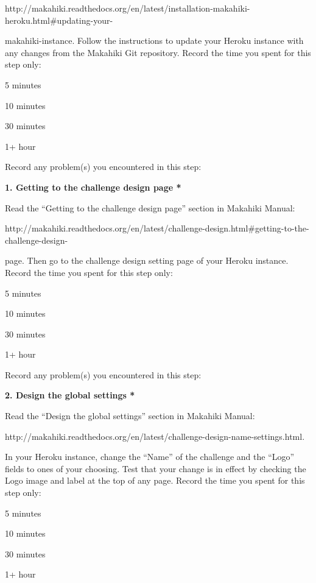 http://makahiki.readthedocs.org/en/latest/installation-makahiki-heroku.html\#updating-your-

makahiki-instance. Follow the instructions to update your Heroku instance with any changes from the Makahiki Git repository. Record the time you spent for this step only:

\begin{radiobutton}
\item 5 minutes
\item  10 minutes
\item  30 minutes
\item  1+ hour
\end{radiobutton}

Record any problem(s) you encountered in this step: \underline{\hspace{4cm}}

{\bf 1. Getting to the challenge design page *}

Read the ``Getting to the challenge design page'' section in Makahiki Manual:

http://makahiki.readthedocs.org/en/latest/challenge-design.html\#getting-to-the-challenge-design-

page. Then go to the challenge design setting page of your Heroku instance. Record the time you spent for this step only:

\begin{radiobutton}
\item 5 minutes
\item  10 minutes
\item  30 minutes
\item  1+ hour
\end{radiobutton}

Record any problem(s) you encountered in this step: \underline{\hspace{4cm}}

{\bf 2. Design the global settings *}

Read the ``Design the global settings'' section in Makahiki Manual:

http://makahiki.readthedocs.org/en/latest/challenge-design-name-settings.html. 

In your Heroku instance, change the ``Name'' of the challenge and the ``Logo'' fields to ones of your choosing. Test that your change is in effect by checking the Logo image and label at the top of any page. Record the time you spent for this step only:

\begin{radiobutton}
\item 5 minutes
\item  10 minutes
\item  30 minutes
\item  1+ hour
\end{radiobutton}


